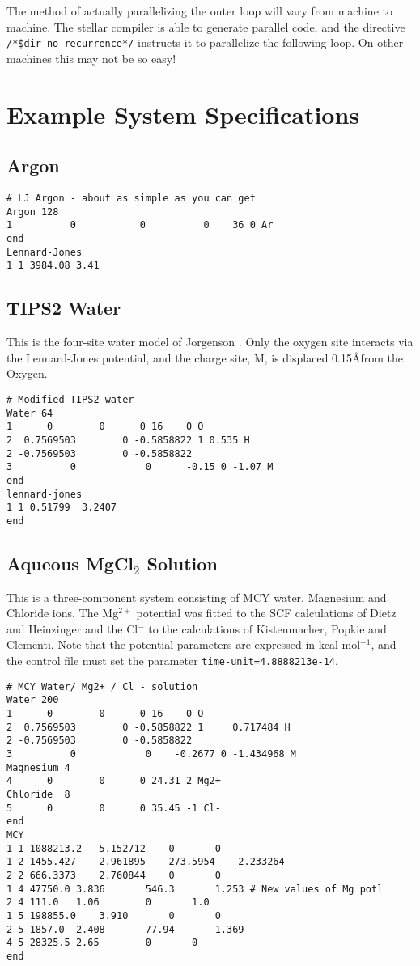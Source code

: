 The method of actually parallelizing the outer loop will vary from
machine to machine. The stellar compiler is able to generate parallel
code, and the directive \verb'/*$dir'~\verb'no_recurrence*/' instructs
it to parallelize the following loop.  On other machines this may not
be so easy!
\appendix
\chapter{Example System Specifications}
\label{sec:examples}
\section{Argon}
\begin{verbatim}
# LJ Argon - about as simple as you can get
Argon 128
1          0           0          0    36 0 Ar
end
Lennard-Jones
1 1 3984.08 3.41
\end{verbatim}
\section{TIPS2 Water}
This is the four-site water model of Jorgenson 
\cite{jorgensen:82}.  Only the oxygen site interacts via the Lennard-Jones
potential, and the charge site, M, is displaced 0.15\AA from the Oxygen.
\begin{verbatim}
# Modified TIPS2 water
Water 64
1 	   0 		0 	   0 16    0 O
2  0.7569503		0 -0.5858822 1 0.535 H
2 -0.7569503		0 -0.5858822
3          0            0      -0.15 0 -1.07 M
end
lennard-jones
1 1 0.51799  3.2407
end
\end{verbatim}
\section{Aqueous MgCl$_2$ Solution}
This is a three-component system consisting of MCY
water\cite{matsuoka:75}, Magnesium and Chloride ions.  The Mg$^{2+}$
potential was fitted to the SCF calculations of Dietz and
Heinzinger\cite{dietz:82} and the Cl$^-$ to the calculations of
Kistenmacher, Popkie and Clementi\cite{kistenmacher:73b}.  Note that
the potential parameters are expressed in kcal mol$^{-1}$, and the
control file must set the parameter \verb'time-unit=4.8888213e-14'.
\begin{verbatim}
# MCY Water/ Mg2+ / Cl - solution
Water 200
1 	   0 		0 	   0 16    0 O
2  0.7569503		0 -0.5858822 1     0.717484 H
2 -0.7569503		0 -0.5858822
3          0            0    -0.2677 0 -1.434968 M
Magnesium 4
4	   0		0	   0 24.31 2 Mg2+
Chloride  8
5	   0		0	   0 35.45 -1 Cl-
end
MCY
1 1 1088213.2 	5.152712 	0 		0
1 2 1455.427 	2.961895 	273.5954 	2.233264
2 2 666.3373 	2.760844 	0 		0
1 4 47750.0	3.836		546.3		1.253 # New values of Mg potl
2 4 111.0	1.06		0		1.0   
1 5 198855.0	3.910		0		0
2 5 1857.0	2.408		77.94		1.369
4 5 28325.5	2.65		0		0
end
\end{verbatim}
